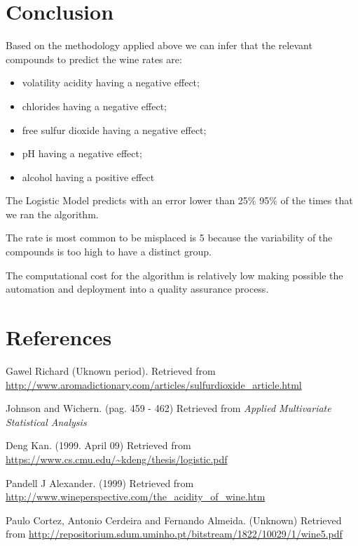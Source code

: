 \documentclass[]{article}
\begin{document}
\section{Conclusion}\label{conclusion}

Based on the methodology applied above we can infer that the relevant
compounds to predict the wine rates are:

\begin{itemize}

\item volatility acidity having a negative effect;
\item chlorides having a negative effect;
\item free sulfur dioxide having a negative effect;
\item pH having a negative effect;
\item alcohol having a positive effect
 \end{itemize}

The Logistic Model predicts with an error lower than 25\% 95\% of the
times that we ran the algorithm.

The rate is most common to be misplaced is 5 because the variability of
the compounds is too high to have a distinct group.

The computational cost for the algorithm is relatively low making
possible the automation and deployment into a quality assurance process.

\section{References}\label{references}

\begin{thebibliography}{1}
 Gawel Richard (Uknown period). Retrieved from \url{http://www.aromadictionary.com/articles/sulfurdioxide_article.html}

 Johnson and Wichern. (pag. 459 - 462) Retrieved from {\em Applied Multivariate Statistical Analysis}

Deng Kan. (1999. April 09) Retrieved from \url{https://www.cs.cmu.edu/~kdeng/thesis/logistic.pdf}

Pandell J Alexander. (1999) Retrieved from \url{http://www.wineperspective.com/the_acidity_of_wine.htm}

 Paulo Cortez, Antonio Cerdeira and Fernando Almeida. (Unknown) Retrieved from \url{http://repositorium.sdum.uminho.pt/bitstream/1822/10029/1/wine5.pdf}

\end{thebibliography}
\end{document}
